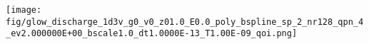 \documentclass[mathserif, aspectratio=169]{beamer}
\newcommand{\of}[1]{\mleft( #1 \mright)}
\newcommand{\vth}{v_{\textrm{th}}}
\newcommand{\myint}{\int\limits}
\newcommand{\vtheta}{{v_{\theta}}}
\begin{document}
\begin{frame}
	\begin{center}
		\texttt{[image: fig/glow\_discharge\_1d3v\_g0\_v0\_z01.0\_E0.0\_poly\_bspline\_sp\_2\_nr128\_qpn\_4\_ev2.000000E+00\_bscale1.0\_dt1.0000E-13\_T1.00E-09\_qoi.png]}
	\end{center}
\end{frame}

%
%	
\end{document}
